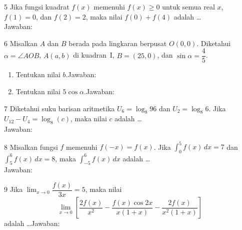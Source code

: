\documentclass[11pt]{article}
\begin{document}
\begin{soal}{5}
Jika fungsi kuadrat $f(x)$ memenuhi $f(x)\geq0$ untuk semua real $x$,
$f(1)=0$, dan $f(2)=2$, maka nilai $f(0)+f(4)$ adalah \ldots\\[0.4em]
Jawaban:\enspace\underline{\hspace{4cm}}
\end{soal}

\begin{soal}{6}
Misalkan $A$ dan $B$ berada pada lingkaran berpusat $O(0,0)$.
Diketahui $\alpha=\angle AOB$, $A(a,b)$ di kuadran~I, $B=(25,0)$,
dan $\sin\alpha=\dfrac{4}{5}$.
\begin{enumerate}[label=(\alph*),leftmargin=*,topsep=3pt,itemsep=4pt]
  \item Tentukan nilai $b$.\hfill Jawaban:\enspace\underline{\hspace{3.5cm}}
  \item Tentukan nilai $5\cos\alpha$.\hfill Jawaban:\enspace\underline{\hspace{3.5cm}}
\end{enumerate}
\end{soal}

\begin{soal}{7}
Diketahui suku barisan aritmetika $U_6=\log_8 96$ dan $U_2=\log_8 6$.
Jika $U_{12}-U_4=\log_8(c)$, maka nilai $c$ adalah \ldots\\[0.4em]
Jawaban:\enspace\underline{\hspace{4cm}}
\end{soal}

\begin{soal}{8}
Misalkan fungsi $f$ memenuhi $f(-x)=f(x)$. Jika $\int_0^5 f(x)\,dx=7$
dan $\int_5^6 f(x)\,dx=8$, maka $\displaystyle\int_{-5}^6 f(x)\,dx$
adalah \ldots\\[0.4em]
Jawaban:\enspace\underline{\hspace{4cm}}
\end{soal}

\begin{soal}{9}
Jika $\displaystyle\lim_{x\to0}\dfrac{f(x)}{3x}=5$, maka nilai
\[
  \lim_{x\to0}\left[\frac{2f(x)}{x^2}-\frac{f(x)\cos2x}{x(1+x)}-\frac{2f(x)}{x^2(1+x)}\right]
\]
adalah \ldots\hfill Jawaban:\enspace\underline{\hspace{3cm}}
\end{soal}
\end{document}
